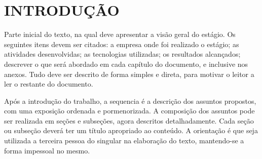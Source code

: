 
\chapter{INTRODUÇÃO}
\label{chap:introducao}

Parte inicial do texto, na qual deve apresentar a visão geral do estágio. Os seguintes itens devem ser citados: a empresa onde foi realizado o estágio; as atividades desenvolvidas; as tecnologias utilizadas; os resultados alcançados; descrever o que será abordado em cada capítulo do documento, e inclusive nos anexos. Tudo deve ser descrito de forma simples e direta, para motivar o leitor a ler o restante do documento.

	Após a introdução do trabalho, a sequencia é a descrição dos assuntos propostos, com uma exposição ordenada e pormenorizada. A composição dos assuntos pode ser realizada em seções e subseções, agora descritos detalhadamente. Cada seção ou subseção deverá ter um título apropriado ao conteúdo. A orientação é que seja utilizada a terceira pessoa do singular na elaboração do texto, mantendo-se a forma impessoal no mesmo.
